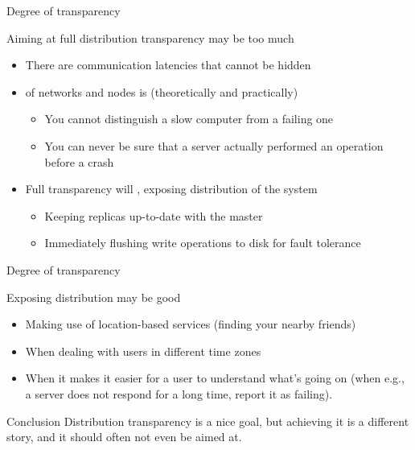 \begin{slide}{Degree of transparency}
  \begin{block}{Aiming at full distribution transparency may be too much}
    \begin{itemize}\firmlist
    \item<2-> There are communication latencies that cannot be hidden
    \item<3->  of networks and nodes is (theoretically and practically)
      \begin{itemize}\tightlist
      \item You cannot distinguish a slow computer from a failing one
      \item You can never be sure that a server actually performed an operation before a crash
      \end{itemize}
    \item<4-> Full transparency will , exposing distribution of the system
      \begin{itemize}\tightlist
      \item Keeping replicas  up-to-date with the master 
      \item Immediately flushing write operations to disk for fault tolerance
      \end{itemize}
    \end{itemize}
  \end{block}
\end{slide}
\begin{slide}{Degree of transparency}
\begin{exampleblock}{Exposing distribution may be good}
    \begin{itemize}
    \item Making use of location-based services (finding your nearby friends)
    \item When dealing with users in different time zones
    \item When it makes it easier for a user to understand what's going on (when e.g., a server does not
      respond for a long time, report it as failing).
    \end{itemize}
  \end{exampleblock}
  \begin{block}{Conclusion}
    Distribution transparency is a nice goal, but achieving it is a different story, and it should often not
    even be aimed at.
  \end{block}
\end{slide}
